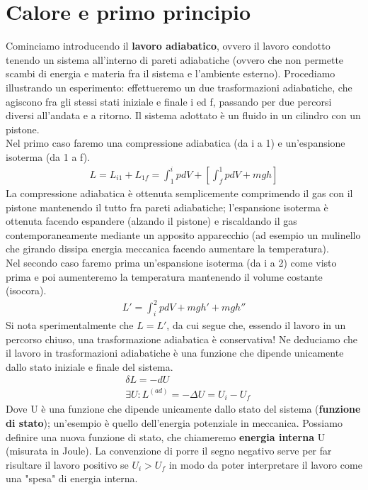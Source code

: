 \documentclass[10pt,a4paper]{article}
\begin{document}
\section{Calore e primo principio}\label{sec:primo_principio}
Cominciamo introducendo il \textbf{lavoro adiabatico}, ovvero il lavoro condotto tenendo un sistema all'interno di pareti adiabatiche (ovvero che non permette scambi di energia e materia fra il sistema e l'ambiente esterno). Procediamo illustrando un esperimento: effettueremo un due trasformazioni adiabatiche, che agiscono fra gli stessi stati iniziale e finale i ed f, passando per due percorsi diversi all'andata e a ritorno. Il sistema adottato è un fluido in un cilindro con un pistone.\\
Nel primo caso faremo una compressione adiabatica (da i a 1) e un'espansione isoterma (da 1 a f). 
\begin{align*} 
	L = L_{i1}+L_{1f}= \int_{1}^{i}pdV +[\int_{f}^{1}pdV+mgh]
\end{align*} 
La compressione adiabatica è ottenuta semplicemente comprimendo il gas con il pistone mantenendo il tutto fra pareti adiabatiche; l'espansione isoterma è ottenuta facendo espandere (alzando il pistone) e riscaldando il gas contemporaneamente mediante un apposito apparecchio (ad esempio un mulinello che girando dissipa energia meccanica facendo aumentare la temperatura).\\
Nel secondo caso faremo prima un'espansione isoterma (da i a 2) come visto prima e poi aumenteremo la temperatura mantenendo il volume costante (isocora). 
\begin{align*} 
	L' = \int_{i}^{2}pdV+mgh'+mgh''
\end{align*} 
Si nota sperimentalmente che $L = L'$, da cui segue che, essendo il lavoro in un percorso chiuso, una trasformazione adiabatica è conservativa! Ne deduciamo che il lavoro in trasformazioni adiabatiche è una funzione che dipende unicamente dallo stato iniziale e finale del sistema. 
\begin{align*} 
	&\delta L = -dU\\
	&\exists U : L^{(ad)} = -\Delta U = U_i-U_f
\end{align*} 
Dove U è una funzione che dipende unicamente dallo stato del sistema (\textbf{funzione di stato}); un'esempio è quello dell'energia potenziale in meccanica.
Possiamo definire una nuova funzione di stato, che chiameremo \textbf{energia interna} U (misurata in Joule). La convenzione di porre il segno negativo serve per far risultare il lavoro positivo se $U_i>U_f$ in modo da poter interpretare il lavoro come una "spesa" di energia interna.\\
\end{document}

